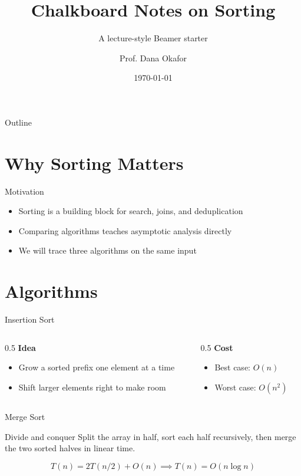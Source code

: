 \documentclass{beamer}
\title{Chalkboard Notes on Sorting}
\subtitle{A lecture-style Beamer starter}
\author{Prof. Dana Okafor}
\institute{Department of Computer Science}
\date{\today}
\begin{document}
\begin{frame}
  \titlepage
\end{frame}

\begin{frame}{Outline}
  \tableofcontents
\end{frame}

\section{Why Sorting Matters}

\begin{frame}{Motivation}
  \begin{itemize}
    \item Sorting is a building block for search, joins, and deduplication
    \item Comparing algorithms teaches asymptotic analysis directly
    \item We will trace three algorithms on the same input
  \end{itemize}
\end{frame}

\section{Algorithms}

\begin{frame}{Insertion Sort}
  \begin{columns}[T]
    \begin{column}{0.5\textwidth}
      \textbf{Idea}
      \begin{itemize}
        \item Grow a sorted prefix one element at a time
        \item Shift larger elements right to make room
      \end{itemize}
    \end{column}
    \begin{column}{0.5\textwidth}
      \textbf{Cost}
      \begin{itemize}
        \item Best case: $O(n)$
        \item Worst case: $O(n^2)$
      \end{itemize}
    \end{column}
  \end{columns}
\end{frame}

\begin{frame}{Merge Sort}
  \begin{block}{Divide and conquer}
    Split the array in half, sort each half recursively, then merge the two
    sorted halves in linear time.
  \end{block}
  \[
    T(n) = 2T(n/2) + O(n) \implies T(n) = O(n \log n)
  \]
\end{frame}
\end{document}
